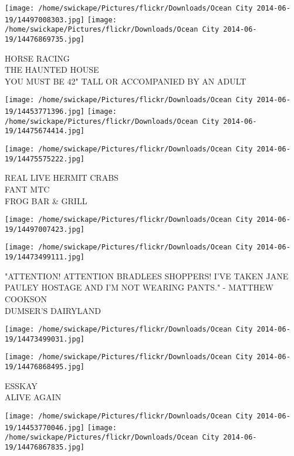 \documentclass[10pt,letterpaper]{article}
\begin{document}
\vspace{0.25in}
\texttt{[image: /home/swickape/Pictures/flickr/Downloads/Ocean City 2014-06-19/14497008303.jpg]}
\texttt{[image: /home/swickape/Pictures/flickr/Downloads/Ocean City 2014-06-19/14476869735.jpg]}

HORSE RACING\\
THE HAUNTED HOUSE\\
YOU MUST BE 42" TALL OR ACCOMPANIED BY AN ADULT\\
\pagebreak

\texttt{[image: /home/swickape/Pictures/flickr/Downloads/Ocean City 2014-06-19/14453771396.jpg]}
\texttt{[image: /home/swickape/Pictures/flickr/Downloads/Ocean City 2014-06-19/14475674414.jpg]}

\texttt{[image: /home/swickape/Pictures/flickr/Downloads/Ocean City 2014-06-19/14475575222.jpg]}

REAL LIVE HERMIT CRABS\\
FANT MTC\\
FROG BAR \& GRILL\\
\pagebreak

\texttt{[image: /home/swickape/Pictures/flickr/Downloads/Ocean City 2014-06-19/14497007423.jpg]}

\vspace{0.25in}
\texttt{[image: /home/swickape/Pictures/flickr/Downloads/Ocean City 2014-06-19/14473499111.jpg]}

"ATTENTION!  ATTENTION BRADLEES SHOPPERS!  I'VE TAKEN JANE PAULEY HOSTAGE AND I'M NOT WEARING PANTS." {-} MATTHEW COOKSON\\
DUMSER'S DAIRYLAND\\
\pagebreak

\texttt{[image: /home/swickape/Pictures/flickr/Downloads/Ocean City 2014-06-19/14473499031.jpg]}

\vspace{0.25in}
\texttt{[image: /home/swickape/Pictures/flickr/Downloads/Ocean City 2014-06-19/14476868495.jpg]}

ESSKAY\\
ALIVE AGAIN\\
\pagebreak

\texttt{[image: /home/swickape/Pictures/flickr/Downloads/Ocean City 2014-06-19/14453770046.jpg]}
\texttt{[image: /home/swickape/Pictures/flickr/Downloads/Ocean City 2014-06-19/14476867835.jpg]}
\end{document}

